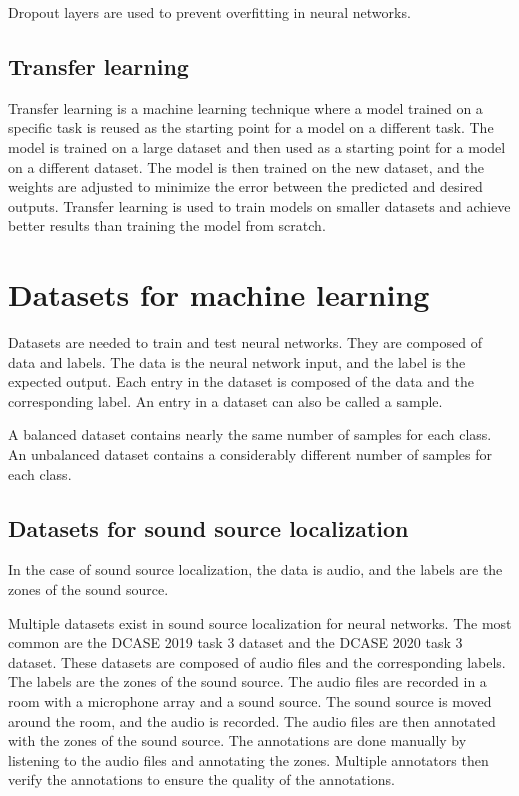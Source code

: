 Dropout layers are used to prevent overfitting in neural networks. 

\subsection{Transfer learning}

Transfer learning is a machine learning technique where a model trained on a specific task is reused as the starting point for a model on a different task. The model is trained on a large dataset and then used as a starting point for a model on a different dataset. The model is then trained on the new dataset, and the weights are adjusted to minimize the error between the predicted and desired outputs. Transfer learning is used to train models on smaller datasets and achieve better results than training the model from scratch.


\section{Datasets for machine learning}

Datasets are needed to train and test neural networks. They are composed of data and labels. The data is the neural network input, and the label is the expected output. Each entry in the dataset is composed of the data and the corresponding label. An entry in a dataset can also be called a sample. 

A balanced dataset contains nearly the same number of samples for each class. An unbalanced dataset contains a considerably different number of samples for each class.

\subsection{Datasets for sound source localization}
\label{sec:datasetsSSL}

In the case of sound source localization, the data is audio, and the labels are the zones of the sound source. 

Multiple datasets exist in sound source localization for neural networks. The most common are the DCASE 2019 task 3 dataset\cite{Adavanne2019_DCASE} and the DCASE 2020 task 3 dataset\cite{politis2020dataset}. These datasets are composed of audio files and the corresponding labels. The labels are the zones of the sound source. The audio files are recorded in a room with a microphone array and a sound source. The sound source is moved around the room, and the audio is recorded. The audio files are then annotated with the zones of the sound source. The annotations are done manually by listening to the audio files and annotating the zones. Multiple annotators then verify the annotations to ensure the quality of the annotations. 

